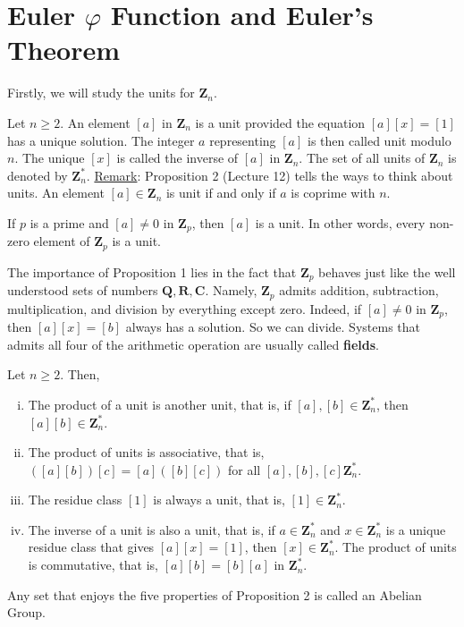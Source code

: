 \section{Euler \texorpdfstring{$ \varphi $}{φ} Function and Euler's Theorem}
Firstly, we will study the units for $ \mathbf{Z}_n $.
\begin{Definition}{}{}
    Let $ n\ge 2 $. An element $ [a] $ in $ \mathbf{Z}_n $ is a unit
    provided the equation $ [a][x]=[1] $ has a unique solution. The integer $ a $
    representing $ [a] $ is then called unit modulo $ n $. The unique $ [x] $ is called
    the inverse of $ [a] $ in $ \mathbf{Z}_n $. The set of all units of $ \mathbf{Z}_n $
    is denoted by $ \mathbf{Z}_n^* $.
    \tcblower{}
    \underline{Remark}: Proposition 2 (Lecture 12) tells the ways to think about units. An element
    $ [a]\in\mathbf{Z}_n $ is unit if and only if $a$ is coprime with $n$.
\end{Definition}
\begin{Proposition}{}{}
    If $ p $ is a prime and $ [a]\ne 0 $ in $ \mathbf{Z}_p $, then $ [a] $ is a unit. In other words,
    every non-zero element of $ \mathbf{Z}_p $ is a unit.
\end{Proposition}
The importance of Proposition 1 lies in the fact that $ \mathbf{Z}_p $ behaves just like the
well understood sets of numbers $ \mathbf{Q},\mathbf{R},\mathbf{C} $. Namely, $ \mathbf{Z}_p $ admits addition, subtraction,
multiplication, and division by everything except zero. Indeed, if $ [a]\ne 0 $ in $ \mathbf{Z}_p $,
then $[a][x] = [b]$ always has a solution. So we can divide. Systems that admits all
four of the arithmetic operation are usually called \textbf{fields}.
\begin{Proposition}{}{}
    Let $ n\ge 2 $. Then,
    \begin{enumerate}[i.]
        \item The product of a unit is another unit, that is, if $ [a],[b]\in\mathbf{Z}_n^* $, then $ [a][b]\in\mathbf{Z}_n^* $.
        \item The product of units is associative, that is, $ ([a][b])[c]=[a]([b][c]) $ for all $ [a],[b],[c]\mathbf{Z}_n^* $.
        \item The residue class $ [1] $ is always a unit, that is, $ [1]\in \mathbf{Z}_n^* $.
        \item The inverse of a unit is also a unit, that is, if $ a\in \mathbf{Z}_n^* $ and $ x\in \mathbf{Z}_n^* $ is a unique
              residue class that gives $ [a][x]=[1] $, then $ [x]\in \mathbf{Z}_n^* $.
              The product of units is commutative, that is, $ [a][b]=[b][a] $ in $ \mathbf{Z}_n^* $.
    \end{enumerate}
    Any set that enjoys the five properties of Proposition 2 is called an Abelian
    Group.
\end{Proposition}
